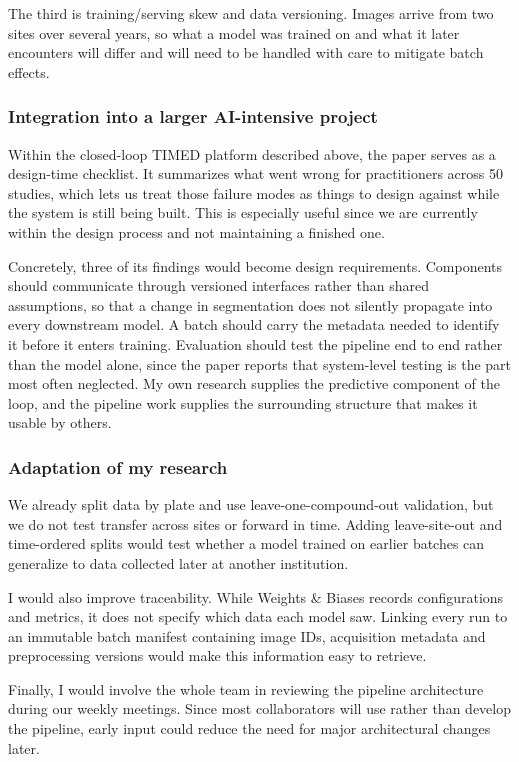 \documentclass{article}
\begin{document}
The third is training/serving skew and data versioning. Images arrive from two sites over several years, so what a model was trained on and what it later encounters will differ and will need to be handled with care to mitigate batch effects.

\subsubsection*{Integration into a larger AI-intensive project}
Within the closed-loop TIMED platform described above, the paper serves as a design-time checklist. It summarizes what went wrong for practitioners across 50 studies, which lets us treat those failure modes as things to design against while the system is still being built. This is especially useful since we are currently within the design process and not maintaining a finished one.

Concretely, three of its findings would become design requirements. Components should communicate through versioned interfaces rather than shared assumptions, so that a change in segmentation does not silently propagate into every downstream model. A batch should carry the metadata needed to identify it before it enters training. Evaluation should test the pipeline end to end rather than the model alone, since the paper reports that system-level testing is the part most often neglected. My own research supplies the predictive component of the loop, and the pipeline work supplies the surrounding structure that makes it usable by others.

\subsubsection*{Adaptation of my research}
We already split data by plate and use leave-one-compound-out validation, but we do not test transfer across sites or forward in time. Adding leave-site-out and time-ordered splits would test whether a model trained on earlier batches can generalize to data collected later at another institution.

I would also improve traceability. While Weights \& Biases records configurations and metrics, it does not specify which data each model saw. Linking every run to an immutable batch manifest containing image IDs, acquisition metadata and preprocessing versions would make this information easy to retrieve.

Finally, I would involve the whole team in reviewing the pipeline architecture during our weekly meetings. Since most collaborators will use rather than develop the pipeline, early input could reduce the need for major architectural changes later.
\end{document}

